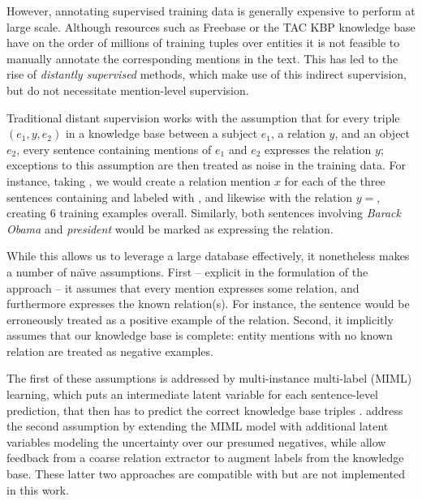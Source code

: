 However, annotating supervised training data is generally
  expensive to perform at large scale.
Although resources such as Freebase or the TAC KBP knowledge base
  have on the order of millions of training tuples over
  entities it is not feasible to manually annotate the 
  corresponding mentions in the text.
This has led to the rise of \textit{distantly supervised} methods, which
  make use of this indirect supervision, but do not
  necessitate mention-level supervision.



Traditional distant supervision works with the assumption that
  for every triple $(e_1, y, e_2)$ in a knowledge base between
  a subject $e_1$, a relation $y$, and an object $e_2$, every sentence
  containing mentions of $e_1$ and $e_2$ expresses the relation $y$;
  exceptions to this assumption are then treated as noise in the training data.
For instance, taking , we would create a relation mention $x$ for each
  of the three sentences containing  and 
  labeled with , and likewise with
  the relation $y=$, creating 6 training examples overall.
Similarly, both sentences involving \textit{Barack Obama} and
  \textit{president} would be marked as expressing the 
  relation.

While this allows us to leverage a large database effectively, it
  nonetheless makes a number of na\"{\i}ve assumptions.
First -- explicit in the formulation of the approach -- it assumes that every
  mention expresses some relation,
  and furthermore expresses the known relation(s).
For instance, the sentence  would be erroneously
  treated as a positive example of the  relation.
Second, it implicitly assumes that our knowledge base is complete:
  entity mentions with no known relation are treated as negative examples.

The first of these assumptions is addressed by
  multi-instance multi-label (MIML) learning, which puts an intermediate latent variable
  for each sentence-level prediction, that then has to predict the correct knowledge base
  triples \cite{key:2012surdeanu-mimlre}.
 address the second assumption by extending the
  MIML model with additional latent variables modeling the uncertainty over our presumed negatives,
  while 
  allow feedback from a coarse relation extractor to augment labels from the knowledge base.
These latter two approaches are compatible with but are 
  not implemented in this work.



